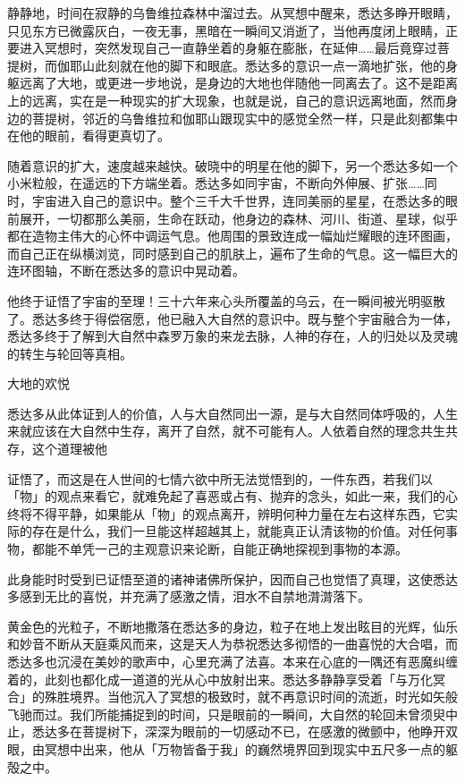 \documentclass[12pt,twoside,openany]{book}
\begin{document}
静静地，时间在寂静的乌鲁维拉森林中溜过去。从冥想中醒来，悉达多睁开眼睛，只见东方已微露灰白，一夜无事，黑暗在一瞬间又消逝了，当他再度闭上眼睛，正要进入冥想时，突然发现自己一直静坐着的身躯在膨胀，在延伸……最后竟穿过菩提树，而伽耶山此刻就在他的脚下和眼底。悉达多的意识一点一滴地扩张，他的身躯远离了大地，或更进一步地说，是身边的大地也伴随他一同离去了。这不是距离上的远离，实在是一种现实的扩大现象，也就是说，自己的意识远离地面，然而身边的菩提树，邻近的乌鲁维拉和伽耶山跟现实中的感觉全然一样，只是此刻都集中在他的眼前，看得更真切了。

随着意识的扩大，速度越来越快。破晓中的明星在他的脚下，另一个悉达多如一个小米粒般，在遥远的下方端坐着。悉达多如同宇宙，不断向外伸展、扩张……同时，宇宙进入自己的意识中。整个三千大千世界，连同美丽的星星，在悉达多的眼前展开，一切都那么美丽，生命在跃动，他身边的森林、河川、街道、星球，似乎都在造物主伟大的心怀中调运气息。他周围的景致连成一幅灿烂耀眼的连环图画，而自己正在纵横浏览，同时感到自己的肌肤上，遍布了生命的气息。这一幅巨大的连环图轴，不断在悉达多的意识中晃动着。

他终于证悟了宇宙的至理！三十六年来心头所覆盖的乌云，在一瞬间被光明驱散了。悉达多终于得偿宿愿，他已融入大自然的意识中。既与整个宇宙融合为一体，悉达多终于了解到大自然中森罗万象的来龙去脉，人神的存在，人的归处以及灵魂的转生与轮回等真相。

大地的欢悦

悉达多从此体证到人的价值，人与大自然同出一源，是与大自然同体呼吸的，人生来就应该在大自然中生存，离开了自然，就不可能有人。人依着自然的理念共生共存，这个道理被他





证悟了，而这是在人世间的七情六欲中所无法觉悟到的，一件东西，若我们以「物」的观点来看它，就难免起了喜恶或占有、抛弃的念头，如此一来，我们的心终将不得平静，如果能从「物」的观点离开，辨明何种力量在左右这样东西，它实际的存在是什么，我们一旦能这样超越其上，就能真正认清该物的价值。对任何事物，都能不单凭一己的主观意识来论断，自能正确地探视到事物的本源。

此身能时时受到已证悟至道的诸神诸佛所保护，因而自己也觉悟了真理，这使悉达多感到无比的喜悦，并充满了感激之情，泪水不自禁地潸潸落下。

黄金色的光粒子，不断地撒落在悉达多的身边，粒子在地上发出眩目的光辉，仙乐和妙音不断从天庭乘风而来，这是天人为恭祝悉达多彻悟的一曲喜悦的大合唱，而悉达多也沉浸在美妙的歌声中，心里充满了法喜。本来在心底的一隅还有恶魔纠缠着的，此刻也都化成一道道的光从心中放射出来。悉达多静静享受着「与万化冥合」的殊胜境界。当他沉入了冥想的极致时，就不再意识时间的流逝，时光如矢般飞驰而过。我们所能捕捉到的时间，只是眼前的一瞬间，大自然的轮回未曾须臾中止，悉达多在菩提树下，深深为眼前的一切感动不已，在感激的微颤中，他睁开双眼，由冥想中出来，他从「万物皆备于我」的巍然境界回到现实中五尺多一点的躯殻之中。
\end{document}
